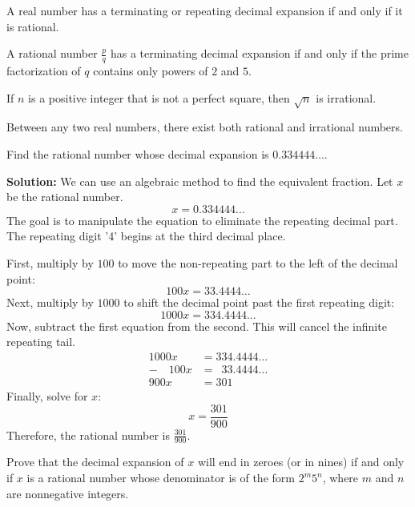 \begin{theorem}
A real number has a terminating or repeating decimal expansion if and only if it is rational.
\end{theorem}

\begin{theorem}
A rational number $\frac{p}{q}$ has a terminating decimal expansion if and only if the prime factorization of $q$ contains only powers of $2$ and $5$.
\end{theorem}

\begin{theorem}
If $n$ is a positive integer that is not a perfect square, then $\sqrt{n}$ is irrational.
\end{theorem}

\begin{theorem}
Between any two real numbers, there exist both rational and irrational numbers.
\end{theorem}

\begin{problembox}
Find the rational number whose decimal expansion is $0.334444\ldots$.
\end{problembox}

\textbf{Solution:}
We can use an algebraic method to find the equivalent fraction. Let $x$ be the rational number.
$$x = 0.334444\ldots$$
The goal is to manipulate the equation to eliminate the repeating decimal part. The repeating digit '4' begins at the third decimal place.

First, multiply by $100$ to move the non-repeating part to the left of the decimal point:
$$100x = 33.4444\ldots$$
Next, multiply by $1000$ to shift the decimal point past the first repeating digit:
$$1000x = 334.4444\ldots$$
Now, subtract the first equation from the second. This will cancel the infinite repeating tail.
\begin{align*}
1000x &= 334.4444\ldots \\
-\quad 100x &= \phantom{0}33.4444\ldots \\
\hline
900x &= 301
\end{align*}
Finally, solve for $x$:
$$x = \frac{301}{900}$$
Therefore, the rational number is \textbf{$\frac{301}{900}$}.

\begin{problembox}
Prove that the decimal expansion of $x$ will end in zeroes (or in nines) if and only if $x$ is a rational number whose denominator is of the form $2^m 5^n$, where $m$ and $n$ are nonnegative integers.
\end{problembox}

